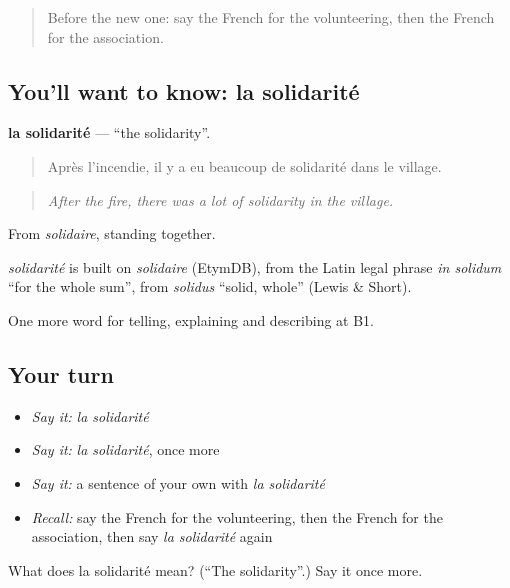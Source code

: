 \begin{quote}
Before the new one: say the French for the volunteering, then the French for the association.
\end{quote}

\subsection*{You'll want to know: la solidarité}
\textbf{la solidarité} — \textquotedblleft{}the solidarity\textquotedblright{}.

\begin{quote}
Après l'incendie, il y a eu beaucoup de solidarité dans le village.
\end{quote}

\begin{quote}
\emph{After the fire, there was a lot of solidarity in the village.}
\end{quote}

From \emph{solidaire}, standing together.

\begin{cousinweb}
\emph{solidarité} is built on \emph{solidaire} (EtymDB), from the Latin legal phrase \emph{in solidum} \textquotedblleft{}for the whole sum\textquotedblright{}, from \emph{solidus} \textquotedblleft{}solid, whole\textquotedblright{} (Lewis \& Short).
\end{cousinweb}

\begin{grammarlens}[title={What you've built}]
One more word for telling, explaining and describing at B1.
\end{grammarlens}

\subsection*{Your turn}
\begin{itemize}
\raggedright
  \item \emph{Say it:} \emph{la solidarité}
  \item \emph{Say it:} \emph{la solidarité}, once more
  \item \emph{Say it:} a sentence of your own with \emph{la solidarité}
  \item \emph{Recall:} say the French for the volunteering, then the French for the association, then say \emph{la solidarité} again
\end{itemize}

\begin{tcolorbox}[breakable,colback=teal!4,colframe=teal!35!black,title={Before you move on}]
What does la solidarité mean? (\textquotedblleft{}The solidarity\textquotedblright{}.) Say it once more.
\end{tcolorbox}
